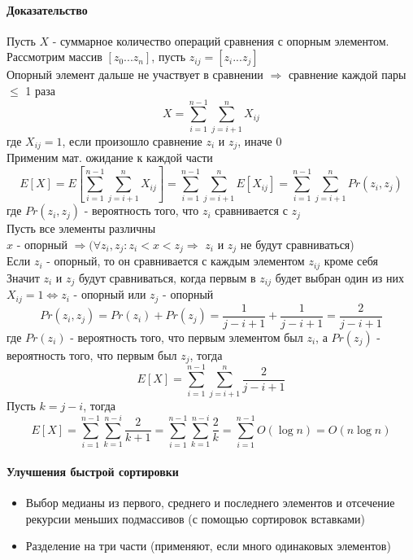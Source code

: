 \documentclass[a4paper,10pt]{article}
\begin{document}
	\paragraph{Доказательство}
	Пусть $X$ - суммарное количество операций сравнения с опорным элементом. Рассмотрим массив
	$[z_{0}...z_{n}]$, пусть $z_{ij} = [z_{i}...z_{j}]$ \\
	Опорный элемент дальше не участвует в сравнении $\Rightarrow$ сравнение каждой пары $\leq$ 1 раза \\
	\[
	X = \sum_{i=1}^{n-1} \sum_{j=i+1}^{n} X_{ij}
	\] 
	где $X_{ij} = 1$, если произошло сравнение $z_{i}$ и $z_{j}$, иначе 0 \\
	Применим мат. ожидание к каждой части
	\[ 
	E[X] = E[\sum_{i=1}^{n-1} \sum_{j=i+1}^{n} X_{ij}] = \sum_{i=1}^{n-1} \sum_{j=i+1}^{n} E[X_{ij}] = \sum_{i=1}^{n-1} \sum_{j=i+1}^{n} Pr(z_{i}, z_{j})
	\]		
	где $Pr(z_{i}, z_{j})$ - вероятность того, что $z_{i}$ сравнивается с $z_{j}$ \\
	Пусть все элементы различны \\
	$x$ - опорный $\Rightarrow (\forall z_{i}, z_{j} \colon z_{i} < x < z_{j} \Rightarrow$ $z_{i}$ и $z_{j}$ не будут сравниваться)  \\
	Если $z_{i}$ - опорный, то он сравнивается с каждым элементом $z_{ij}$ кроме себя \\
	Значит $z_{i}$ и $z_{j}$ будут сравниваться, когда первым в $z_{ij}$ будет выбран один из них \\
	$X_{ij} = 1 \Leftrightarrow z_{i}$ - опорный или $z_{j}$ - опорный
	\[ 
	Pr(z_{i}, z_{j}) = Pr(z_{i}) + Pr(z_{j}) = \frac{1}{j-i+1} + \frac{1}{j-i+1} = \frac{2}{j-i+1}
	\]
	где $Pr(z_{i})$ - вероятность того, что первым элементом был $z_{i}$, а $Pr(z_{j})$ - вероятность того, что первым был $z_{j}$, тогда
	\[
	E[X] =  \sum_{i=1}^{n-1} \sum_{j=i+1}^{n} \frac{2}{j-i+1}
	\]
	Пусть $k = j - i$, тогда
	\[
	E[X] =  \sum_{i=1}^{n-1} \sum_{k=1}^{n-i} \frac{2}{k+1} = \sum_{i=1}^{n-1} \sum_{k=1}^{n-i} \frac{2}{k} = \sum_{i=1}^{n-1} O(\log{n}) = O(n\log{n})
	\]
	\paragraph{Улучшения быстрой сортировки}
	\begin{itemize}
		\item Выбор медианы из первого, среднего и последнего элементов и отсечение рекурсии меньших подмассивов (с помощью сортировок вставками)
		\item Разделение на три части (применяют, если много одинаковых элементов)
	\end{itemize}
\end{document}

